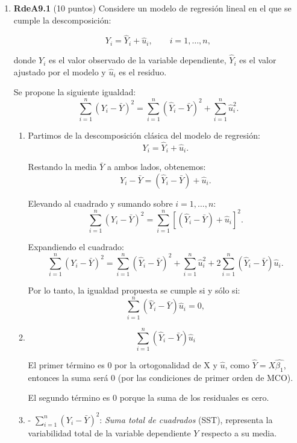 \documentclass[10pt,a4paper]{article}
\begin{document}
\begin{enumerate}
\item \textbf{RdeA9.1} (10 puntos) 
Considere un modelo de regresión lineal en el que se cumple la descomposición:

\[
Y_i = \hat{Y}_i + \hat{u}_i, \qquad i = 1,\dots,n,
\]

donde $Y_i$ es el valor observado de la variable dependiente, $\hat{Y}_i$ es el valor ajustado por el modelo y $\hat{u}_i$ es el residuo. 

Se propone la siguiente igualdad:
\[
\sum_{i=1}^n (Y_i - \bar{Y})^2 
= \sum_{i=1}^n (\hat{Y}_i - \bar{Y})^2 
+ \sum_{i=1}^n \hat{u}_i^2.
\]


\begin{enumerate}
    \item 

Partimos de la descomposición clásica del modelo de regresión:
\[
Y_i = \hat{Y}_i + \hat{u}_i.
\]

Restando la media \(\bar{Y}\) a ambos lados, obtenemos:
\[
Y_i - \bar{Y} = (\hat{Y}_i - \bar{Y}) + \hat{u}_i.
\]

Elevando al cuadrado y sumando sobre \(i=1,\ldots,n\):
\[
\sum_{i=1}^n (Y_i - \bar{Y})^2 = \sum_{i=1}^n \left[ (\hat{Y}_i - \bar{Y}) + \hat{u}_i \right]^2.
\]

Expandiendo el cuadrado:
\[
\sum_{i=1}^n (Y_i - \bar{Y})^2 = \sum_{i=1}^n (\hat{Y}_i - \bar{Y})^2 + \sum_{i=1}^n \hat{u}_i^2 + 2 \sum_{i=1}^n (\hat{Y}_i - \bar{Y}) \hat{u}_i.
\]

Por lo tanto, la igualdad propuesta se cumple si y sólo si:
\[
 \sum_{i=1}^n (\hat{Y}_i - \bar{Y}) \hat{u}_i = 0,
\]

 \item   {} 

\[
\sum_{i=1}^n (\hat{Y}_i - \bar{Y}) \hat{u}_i
\]

El primer término es \(0\) por la ortogonalidad de X y $\hat{u}$, como \(\hat{Y}=X\hat{\beta_1}\), entonces la suma será 0 (por las condiciones de primer orden de MCO).

El segundo término es \(0\) porque la suma de los residuales es cero.


 \item   {} 

- \(\displaystyle \sum_{i=1}^n (Y_i - \bar{Y})^2\): \textit{Suma total de cuadrados} (SST), representa la variabilidad total de la variable dependiente \(Y\) respecto a su media.


\end{enumerate}
\end{enumerate}
\end{document}
